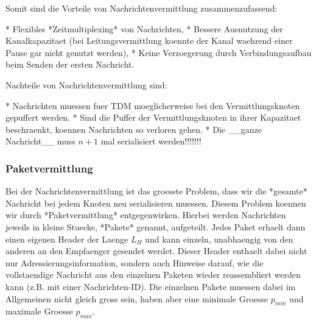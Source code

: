 Somit sind die Vorteile von Nachrichtenvermittlung zusammenzufassend:

* Flexibles *Zeitmultiplexing* von Nachrichten,
* Bessere Ausnutzung der Kanalkapazitaet (bei Leitungsvermittlung koennte der
  Kanal waehrend einer Pause gar nicht genutzt werden),
* Keine Verzoegerung durch Verbindungsaufbau beim Senden der ersten Nachricht.

Nachteile von Nachrichtenvermittlung sind:

* Nachrichten muessen fuer TDM moeglicherweise bei den Vermittlungsknoten
  gepuffert werden.
* Sind die Puffer der Vermittlungsknoten in ihrer Kapazitaet beschraenkt,
  koennen Nachrichten so verloren gehen.
* Die \_\_ganze Nachricht\_\_ muss $n + 1$ mal serialisiert werden!!!!!!!

\subsubsection{Paketvermittlung} 

Bei der Nachrichtenvermittlung ist das groesste Problem, dass wir die *gesamte*
Nachricht bei jedem Knoten neu serialisieren muessen. Diesem Problem koennen wir
durch *Paketvermittlung* entgegenwirken. Hierbei werden Nachrichten jeweils in
kleine Stuecke, *Pakete* genannt, aufgeteilt. Jedes Paket erhaelt dann einen
eigenen Header der Laenge $L_H$ und kann einzeln, unabhaengig von den anderen an
den Empfaenger gesendet werdet. Dieser Header enthaelt dabei nicht nur
Adressierungsinformation, sondern auch Hinweise darauf, wie die vollstaendige
Nachricht aus den einzelnen Paketen wieder reassembliert werden kann (z.B. mit
einer Nachrichten-ID). Die einzelnen Pakete muessen dabei im Allgemeinen nicht
gleich gross sein, haben aber eine minimale Groesse $p_{min}$ und maximale
Groesse $p_{max}$.

